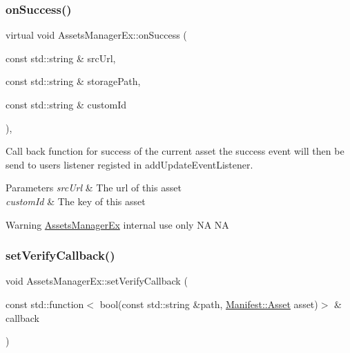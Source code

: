 \subsubsection{\texorpdfstring{on\+Success()}{onSuccess()}\hspace{0.1cm}{\footnotesize\ttfamily [2/2]}}
{\footnotesize\ttfamily virtual void Assets\+Manager\+Ex\+::on\+Success (\begin{DoxyParamCaption}\item[{const std\+::string \&}]{src\+Url,  }\item[{const std\+::string \&}]{storage\+Path,  }\item[{const std\+::string \&}]{custom\+Id }\end{DoxyParamCaption})\hspace{0.3cm}{\ttfamily [protected]}, {\ttfamily [virtual]}}



Call back function for success of the current asset the success event will then be send to user\textquotesingle{}s listener registed in add\+Update\+Event\+Listener. 


\begin{DoxyParams}{Parameters}
{\em src\+Url} & The url of this asset \\
\hline
{\em custom\+Id} & The key of this asset \\
\hline
\end{DoxyParams}
\begin{DoxyWarning}{Warning}
\hyperlink{classAssetsManagerEx}{Assets\+Manager\+Ex} internal use only  NA  NA 
\end{DoxyWarning}
\mbox{\label{classAssetsManagerEx_af16a300f640be0dba1a1b996918b7046}} 
\subsubsection{\texorpdfstring{set\+Verify\+Callback()}{setVerifyCallback()}}
{\footnotesize\ttfamily void Assets\+Manager\+Ex\+::set\+Verify\+Callback (\begin{DoxyParamCaption}\item[{const std\+::function$<$ bool(const std\+::string \&path, \hyperlink{structManifest_1_1Asset}{Manifest\+::\+Asset} asset)$>$ \&}]{callback }\end{DoxyParamCaption})\hspace{0.3cm}{\ttfamily [inline]}}



